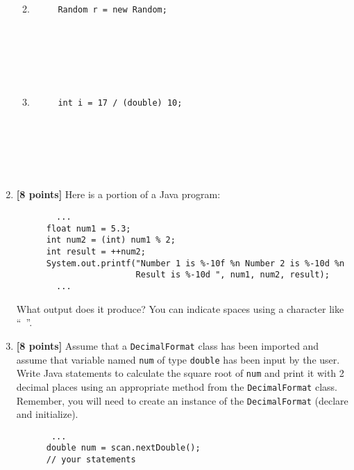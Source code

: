 \documentclass[11pt]{report}
\begin{document}
\begin{enumerate}
\begin{enumerate}
\begin{verbatim}
     
     
     
     
     
\end{verbatim}
\item \mbox{}

\begin{verbatim}
     Random r = new Random;
     
     
     
     
     
     
\end{verbatim}
\item \mbox{}

\begin{verbatim}
     int i = 17 / (double) 10;
     
     
     
     
     
     
\end{verbatim}
\end{enumerate}


\item{\bf [8 points]}
Here is a portion of a Java program:
\begin{verbatim}
        ...
      float num1 = 5.3;
      int num2 = (int) num1 % 2;
      int result = ++num2;
      System.out.printf("Number 1 is %-10f %n Number 2 is %-10d %n 
      					Result is %-10d ", num1, num2, result);
        ...
\end{verbatim}
What output does it produce? You can indicate spaces using a character like ``\verb*$ $''.

\vspace{1.2in}
\item {\bf [8 points]}
Assume that a {\tt DecimalFormat} class has been imported and assume that variable named {\tt num} of type {\tt double} has been input by the user. Write Java statements to calculate the square root of {\tt num} and print it with 2 decimal places using an appropriate method from the {\tt DecimalFormat} class. Remember, you will need to create an instance of the {\tt DecimalFormat} (declare and initialize). 
\begin{verbatim}
       ...
      double num = scan.nextDouble();
      // your statements
      
      
      
      
      
      
      
      
      
      
      
   

\end{verbatim}

\end{enumerate}
 
\end{document}
